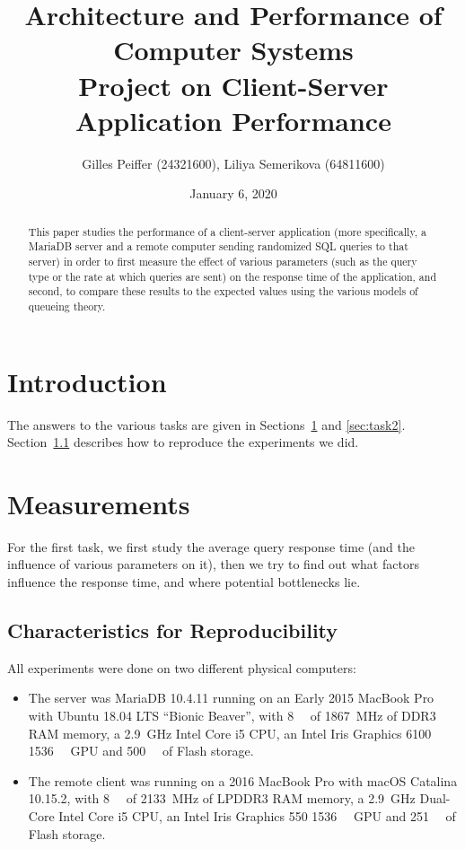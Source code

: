 \documentclass[journal]{IEEEtran}
\title{Architecture and Performance of Computer Systems \\ Project on Client-Server Application Performance}
\author{Gilles Peiffer (24321600), Liliya Semerikova (64811600)}
\date{January 6, 2020}
\theoremstyle{definition}
\begin{document}
\maketitle

\begin{abstract}
	This paper studies the performance of a client-server application (more specifically, a MariaDB server and a remote computer sending randomized SQL queries to that server) in order to first measure the effect of various parameters (such as the query type or the rate at which queries are sent) on the response time of the application, and second, to compare these results to the expected values using the various models of queueing theory.
\end{abstract}

\section*{Introduction}
The answers to the various tasks are given in Sections~\ref{sec:task1} and \ref{sec:task2}.
Section~\ref{sec:char} describes how to reproduce the experiments we did.

\section{Measurements}
\label{sec:task1}
For the first task, we first study the average query response time (and the influence of various parameters on it), then we try to find out what factors influence the response time, and where potential bottlenecks lie.

\subsection{Characteristics for Reproducibility}
\label{sec:char}
All experiments were done on two different physical computers:
\begin{itemize}
	\item The server was MariaDB 10.4.11 running on an Early 2015 MacBook Pro with Ubuntu 18.04 LTS ``Bionic Beaver'', with \SI{8}{\giga\byte} of \SI{1867}{\mega\hertz} of DDR3 RAM memory, a \SI{2.9}{\giga\hertz} Intel Core i5 CPU, an Intel Iris Graphics 6100 \SI{1536}{\mega\byte} GPU and \SI{500}{\giga\byte} of Flash storage.
	\item The remote client was running on a 2016 MacBook Pro with macOS Catalina 10.15.2, with \SI{8}{\giga\byte} of \SI{2133}{\mega\hertz} of LPDDR3 RAM memory, a \SI{2.9}{\giga\hertz} Dual-Core Intel Core i5 CPU, an Intel Iris Graphics 550 \SI{1536}{\mega\byte} GPU and \SI{251}{\giga\byte} of Flash storage.
\end{itemize}
\end{document}
